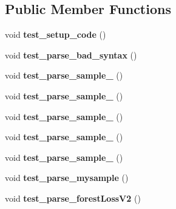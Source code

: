 \subsection*{Public Member Functions}
\begin{DoxyCompactItemize}
\item 
\hypertarget{classParserTestSuite_ab7eff3217b5e28c9003f27c51da107ac}{void {\bfseries test\-\_\-setup\-\_\-code} ()}\label{classParserTestSuite_ab7eff3217b5e28c9003f27c51da107ac}

\item 
\hypertarget{classParserTestSuite_ac4a829a66a1582bee38e90ac3f0355f4}{void {\bfseries test\-\_\-parse\-\_\-bad\-\_\-syntax} ()}\label{classParserTestSuite_ac4a829a66a1582bee38e90ac3f0355f4}

\item 
\hypertarget{classParserTestSuite_a26eed485bc2671f4ac256ef97a21b704}{void {\bfseries test\-\_\-parse\-\_\-sample\-\_} ()}\label{classParserTestSuite_a26eed485bc2671f4ac256ef97a21b704}

\item 
\hypertarget{classParserTestSuite_a0f1d6af1e07e35541fb83416d5e3e229}{void {\bfseries test\-\_\-parse\-\_\-sample\-\_} ()}\label{classParserTestSuite_a0f1d6af1e07e35541fb83416d5e3e229}

\item 
\hypertarget{classParserTestSuite_aecc132f6b6dbb2e5bba08baec64f3f65}{void {\bfseries test\-\_\-parse\-\_\-sample\-\_} ()}\label{classParserTestSuite_aecc132f6b6dbb2e5bba08baec64f3f65}

\item 
\hypertarget{classParserTestSuite_a6e5dfaf7b8ddc98001a4fec39b3f0a79}{void {\bfseries test\-\_\-parse\-\_\-sample\-\_} ()}\label{classParserTestSuite_a6e5dfaf7b8ddc98001a4fec39b3f0a79}

\item 
\hypertarget{classParserTestSuite_a5b9a3cf2b76271244baaaaa4c8b7f7d5}{void {\bfseries test\-\_\-parse\-\_\-sample\-\_} ()}\label{classParserTestSuite_a5b9a3cf2b76271244baaaaa4c8b7f7d5}

\item 
\hypertarget{classParserTestSuite_ae59d0f6d92f8d83833d51ef01479fdeb}{void {\bfseries test\-\_\-parse\-\_\-mysample} ()}\label{classParserTestSuite_ae59d0f6d92f8d83833d51ef01479fdeb}

\item 
\hypertarget{classParserTestSuite_a379db1a22b2c32defb8395b9b2166f76}{void {\bfseries test\-\_\-parse\-\_\-forest\-Loss\-V2} ()}\label{classParserTestSuite_a379db1a22b2c32defb8395b9b2166f76}

\end{DoxyCompactItemize}
